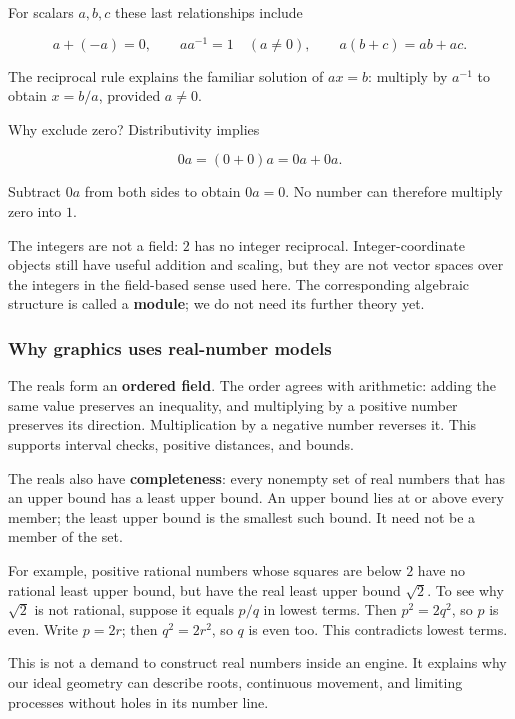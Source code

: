 For scalars \(a,b,c\) these last relationships include

\[
a+(-a)=0,\qquad aa^{-1}=1\quad(a\ne0),\qquad a(b+c)=ab+ac.
\]

The reciprocal rule explains the familiar solution of \(ax=b\): multiply by \(a^{-1}\) to obtain \(x=b/a\), provided \(a\ne0\).

Why exclude zero? Distributivity implies

\[
0a=(0+0)a=0a+0a.
\]

Subtract \(0a\) from both sides to obtain \(0a=0\). No number can therefore multiply zero into \(1\).

The integers are not a field: \(2\) has no integer reciprocal. Integer-coordinate objects still have useful addition and scaling, but they are not vector spaces over the integers in the field-based sense used here. The corresponding algebraic structure is called a \textbf{module}; we do not need its further theory yet.

\subsubsection{Why graphics uses real-number models}\label{01-foundations-i-ch017-why-graphics-uses-real-number-models}

The reals form an \textbf{ordered field}. The order agrees with arithmetic: adding the same value preserves an inequality, and multiplying by a positive number preserves its direction. Multiplication by a negative number reverses it. This supports interval checks, positive distances, and bounds.

The reals also have \textbf{completeness}: every nonempty set of real numbers that has an upper bound has a least upper bound. An upper bound lies at or above every member; the least upper bound is the smallest such bound. It need not be a member of the set.

For example, positive rational numbers whose squares are below \(2\) have no rational least upper bound, but have the real least upper bound \(\sqrt2\). To see why \(\sqrt2\) is not rational, suppose it equals \(p/q\) in lowest terms. Then \(p^2=2q^2\), so \(p\) is even. Write \(p=2r\); then \(q^2=2r^2\), so \(q\) is even too. This contradicts lowest terms.

This is not a demand to construct real numbers inside an engine. It explains why our ideal geometry can describe roots, continuous movement, and limiting processes without holes in its number line.

